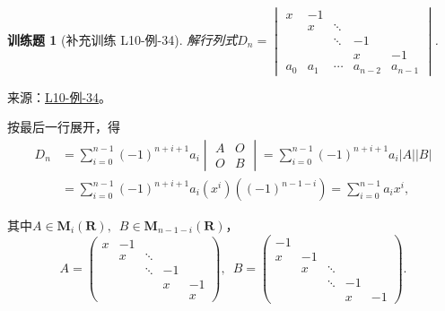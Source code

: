 \documentclass[UTF8,12pt,a4paper,fontset=fandol]{ctexart}
\newtheorem{exercise}{训练题}[section]
\begin{document}
\begin{exercise}[补充训练 L10-例-34]\label{prob:L10-例-34}
解行列式$D_n=\begin{vmatrix}
            x     & -1    &        &         &         \\
                  & x     & \ddots &         &         \\
                  &       & \ddots & -1      &         \\
                  &       &        & x       & -1      \\
            a_{0} & a_{1} & \cdots & a_{n-2} & a_{n-1}
        \end{vmatrix}$.
\end{exercise}
\noindent 来源：\href{https://github.com/yhwu-is/Linear-Algebra-Left-Undone/blob/new/%E8%AE%B2%E4%B9%89/%E4%B8%93%E9%A2%98/10%20%E8%A1%8C%E5%88%97%E5%BC%8F.tex}{L10-例-34}。
\begin{solve}
按最后一行展开，得
    \begin{align*}
        D_n & =\sum_{i=0}^{n-1}(-1)^{n+i+1}a_i\begin{vmatrix} A & O \\ O & B \end{vmatrix}
        =\sum_{i=0}^{n-1}(-1)^{n+i+1}a_i|A||B|                                                        \\
            & =\sum_{i=0}^{n-1}(-1)^{n+i+1}a_i(x^i)\left((-1)^{n-1-i}\right) =\sum_{i=0}^{n-1}a_i x^i,
    \end{align*}

    其中$A\in \mathbf{M}_i(\mathbf{R}),\enspace B\in \mathbf{M}_{n-1-i}(\mathbf{R})$，
    \[ A=\begin{pmatrix}
            x & -1 &        &    &    \\
              & x  & \ddots &    &    \\
              &    & \ddots & -1 &    \\
              &    &        & x  & -1 \\
              &    &        &    & x
        \end{pmatrix},\enspace
        B=\begin{pmatrix}
            -1 &    &        &    &    \\
            x  & -1 &        &    &    \\
               & x  & \ddots &    &    \\
               &    & \ddots & -1 &    \\
               &    &        & x  & -1
        \end{pmatrix}. \]
\end{solve}
\end{document}
